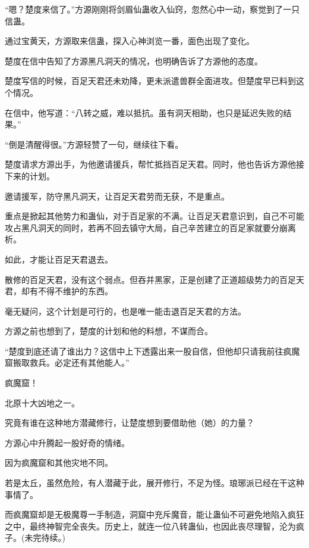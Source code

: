 \begin{this_body}
“嗯？楚度来信了。”方源刚刚将剑眉仙蛊收入仙窍，忽然心中一动，察觉到了一只信蛊。

通过宝黄天，方源取来信蛊，探入心神浏览一番，面色出现了变化。

楚度在信中告知了方源黑凡洞天的情况，也明确告诉了方源他的态度。

楚度写信的时候，百足天君还未劝降，更未派遣兽群全面进攻。但楚度早已料到这个情况。

在信中，他写道：“八转之威，难以抵抗。虽有洞天相助，也只是延迟失败的结果。”

“倒是清醒得很。”方源轻赞了一句，继续往下看。

楚度请求方源出手，为他邀请援兵，帮忙抵挡百足天君。同时，他也告诉方源他接下来的计划。

邀请援军，防守黑凡洞天，让百足天君劳而无获，不是重点。

重点是掀起其他势力和蛊仙，对于百足家的不满。让百足天君意识到，自己不可能攻占黑凡洞天的同时，若再不回去镇守大局，自己辛苦建立的百足家就要分崩离析。

如此，才能让百足天君退去。

散修的百足天君，没有这个弱点。但吞并黑家，正是创建了正道超级势力的百足天君，却有不得不维护的东西。

毫无疑问，这个计划是可行的，也是唯一能击退百足天君的方法。

方源之前也想到了，楚度的计划和他的料想，不谋而合。

“楚度到底还请了谁出力？这信中上下透露出来一股自信，但他却只请我前往疯魔窟搬取救兵。必定还有其他能人。”

疯魔窟！

北原十大凶地之一。

究竟有谁在这种地方潜藏修行，让楚度想到要借助他（她）的力量？

方源心中升腾起一股好奇的情绪。

因为疯魔窟和其他灾地不同。

若是太丘，虽然危险，有人潜藏于此，展开修行，不足为怪。琅琊派已经在干这种事情了。

而疯魔窟却是无极魔尊一手制造，洞窟中充斥魔音，能让蛊仙不可避免地陷入疯狂之中，最终神智完全丧失。历史上，就连一位八转蛊仙，也因此丧尽理智，沦为疯子。(未完待续。)

\end{this_body}

